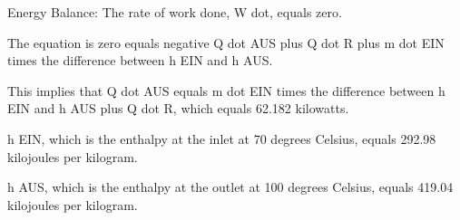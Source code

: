 Energy Balance:
The rate of work done, W dot, equals zero.

The equation is zero equals negative Q dot AUS plus Q dot R plus m dot EIN times the difference between h EIN and h AUS.

This implies that Q dot AUS equals m dot EIN times the difference between h EIN and h AUS plus Q dot R, which equals 62.182 kilowatts.

h EIN, which is the enthalpy at the inlet at 70 degrees Celsius, equals 292.98 kilojoules per kilogram.

h AUS, which is the enthalpy at the outlet at 100 degrees Celsius, equals 419.04 kilojoules per kilogram.